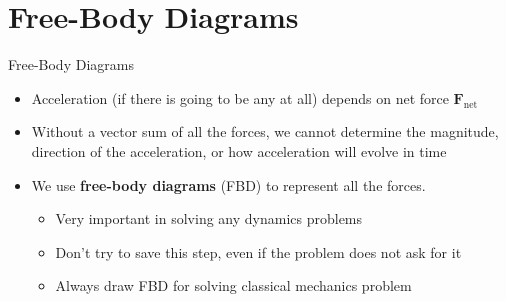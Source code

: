 \documentclass[12pt,compress,aspectratio=169]{beamer}
\begin{document}
%
%
%
%  
%



\section{Free-Body Diagrams}

\begin{frame}{Free-Body Diagrams}
  \begin{itemize}
  \item Acceleration (if there is going to be any at all) depends
    on net force $\bm F_\text{net}$
  \item Without a vector sum of all the forces, we cannot determine the
    magnitude, direction of the acceleration, or how acceleration will evolve
    in time
  \item We use \textbf{free-body diagrams} (FBD) to represent all the forces.
    \begin{itemize}
    \item Very important in solving any dynamics problems
    \item Don't try to save this step, even if the problem does not ask for it
    \item Always draw FBD for solving classical mechanics problem
    \end{itemize}
  \end{itemize}
\end{frame}
\end{document}
